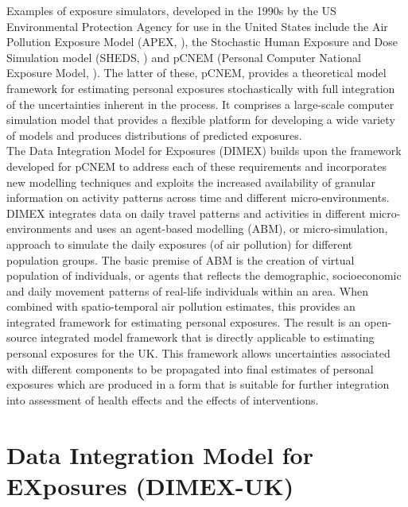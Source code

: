 \documentclass{article}
\begin{document}
\noindent Examples of exposure simulators, developed in the 1990s by  the US Environmental Protection Agency for use in the United States  include the Air Pollution Exposure Model (APEX, \cite{EPA1, EPA2}),  the Stochastic Human Exposure and Dose Simulation model (SHEDS, \cite{EPA3}) and  pCNEM (Personal Computer National Exposure Model, \cite{zidek2003computational, zidek2007framework}). The latter of these, pCNEM, provides a theoretical model framework for estimating personal exposures stochastically with full integration of the uncertainties inherent in the process. It comprises a large-scale computer simulation model that provides a flexible platform for developing a wide variety of models and produces distributions of predicted exposures. \\

\noindent The Data Integration Model for Exposures (DIMEX) builds upon the framework developed for pCNEM to address each of these requirements and incorporates new modelling techniques and exploits the increased availability of granular information on activity patterns across time and different micro-environments. DIMEX integrates data on daily travel patterns and activities in different micro-environments and uses an agent-based modelling (ABM), or micro-simulation, approach  to simulate the daily exposures (of air pollution) for different population groups. The basic premise of ABM is the creation of virtual population of individuals, or agents that reflects the demographic, socioeconomic and daily movement patterns of real-life individuals within an area. When combined with spatio-temporal air pollution estimates, this provides an integrated framework for estimating personal exposures. The result is an open-source integrated model framework that is directly applicable to estimating personal exposures for the UK. This framework  allows  uncertainties associated with different components to be propagated into final estimates of personal exposures which are produced in a form that is suitable for further integration into assessment of health effects and the effects of interventions.

\clearpage
\section{Data Integration Model for EXposures  (DIMEX-UK)}\label{sec::dimex}
\end{document}
